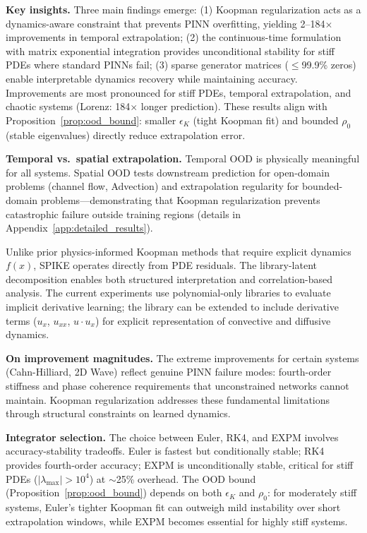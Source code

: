 \documentclass{article}
\theoremstyle{remark}
\begin{document}
\textbf{Key insights.} Three main findings emerge: (1) Koopman regularization acts as a dynamics-aware constraint that prevents PINN overfitting, yielding 2--184$\times$ improvements in temporal extrapolation; (2) the continuous-time formulation with matrix exponential integration provides unconditional stability for stiff PDEs where standard PINNs fail; (3) sparse generator matrices ($\leq$99.9\% zeros) enable interpretable dynamics recovery while maintaining accuracy. Improvements are most pronounced for stiff PDEs, temporal extrapolation, and chaotic systems (Lorenz: 184$\times$ longer prediction). These results align with Proposition~\ref{prop:ood_bound}: smaller $\epsilon_K$ (tight Koopman fit) and bounded $\rho_0$ (stable eigenvalues) directly reduce extrapolation error.

\textbf{Temporal vs.\ spatial extrapolation.} Temporal OOD is physically meaningful for all systems. Spatial OOD tests downstream prediction for open-domain problems (channel flow, Advection) and extrapolation regularity for bounded-domain problems---demonstrating that Koopman regularization prevents catastrophic failure outside training regions (details in Appendix~\ref{app:detailed_results}).

Unlike prior physics-informed Koopman methods \citep{liu2022physicskoopman} that require explicit dynamics $f(x)$, SPIKE operates directly from PDE residuals. The library-latent decomposition enables both structured interpretation and correlation-based analysis. The current experiments use polynomial-only libraries to evaluate implicit derivative learning; the library can be extended to include derivative terms ($u_x$, $u_{xx}$, $u \cdot u_x$) for explicit representation of convective and diffusive dynamics.

\textbf{On improvement magnitudes.} The extreme improvements for certain systems (Cahn-Hilliard, 2D Wave) reflect genuine PINN failure modes: fourth-order stiffness and phase coherence requirements that unconstrained networks cannot maintain. Koopman regularization addresses these fundamental limitations through structural constraints on learned dynamics.

\textbf{Integrator selection.} The choice between Euler, RK4, and EXPM involves accuracy-stability tradeoffs. Euler is fastest but conditionally stable; RK4 provides fourth-order accuracy; EXPM is unconditionally stable, critical for stiff PDEs ($|\lambda_{\max}| > 10^4$) at $\sim$25\% overhead. The OOD bound (Proposition~\ref{prop:ood_bound}) depends on both $\epsilon_K$ and $\rho_0$: for moderately stiff systems, Euler's tighter Koopman fit can outweigh mild instability over short extrapolation windows, while EXPM becomes essential for highly stiff systems.
\end{document}
